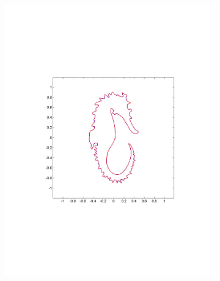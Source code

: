 \documentclass[review]{acmsiggraph}
\begin{document}
\begin{figure}
        \centering
		\begin{subfigure}[b]{0.34\linewidth}
                \centering
                \includegraphics[width=\textwidth]{images/seahorse/1.pdf}
       \end{subfigure}
		~
		\begin{subfigure}[b]{0.34\linewidth}
                \centering

\end{subfigure}
\end{figure}
\end{document}
